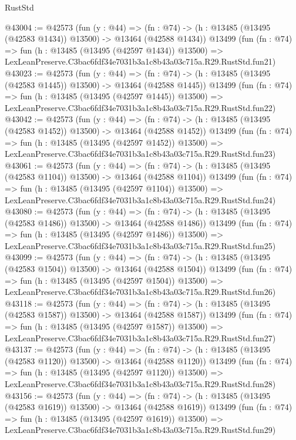 \begin{lexlean}{RustStd}
\begin{coremodule}
@43004 := @42573
    (fun (y : @44) =>
    (fn : @74) -> (h : @13485 (@13495 (@42583 @1434)) @13500) -> @13464 (@42588 @1434))
    @13499
    (fun (fn : @74) =>
    fun (h : @13485 (@13495 (@42597 @1434)) @13500) =>
    LexLeanPreserve.C3bac6fdf34e7031b3a1c8b43a03c715a.R29.RustStd.fun21)
@43023 := @42573
    (fun (y : @44) =>
    (fn : @74) -> (h : @13485 (@13495 (@42583 @1445)) @13500) -> @13464 (@42588 @1445))
    @13499
    (fun (fn : @74) =>
    fun (h : @13485 (@13495 (@42597 @1445)) @13500) =>
    LexLeanPreserve.C3bac6fdf34e7031b3a1c8b43a03c715a.R29.RustStd.fun22)
@43042 := @42573
    (fun (y : @44) =>
    (fn : @74) -> (h : @13485 (@13495 (@42583 @1452)) @13500) -> @13464 (@42588 @1452))
    @13499
    (fun (fn : @74) =>
    fun (h : @13485 (@13495 (@42597 @1452)) @13500) =>
    LexLeanPreserve.C3bac6fdf34e7031b3a1c8b43a03c715a.R29.RustStd.fun23)
@43061 := @42573
    (fun (y : @44) =>
    (fn : @74) -> (h : @13485 (@13495 (@42583 @1104)) @13500) -> @13464 (@42588 @1104))
    @13499
    (fun (fn : @74) =>
    fun (h : @13485 (@13495 (@42597 @1104)) @13500) =>
    LexLeanPreserve.C3bac6fdf34e7031b3a1c8b43a03c715a.R29.RustStd.fun24)
@43080 := @42573
    (fun (y : @44) =>
    (fn : @74) -> (h : @13485 (@13495 (@42583 @1486)) @13500) -> @13464 (@42588 @1486))
    @13499
    (fun (fn : @74) =>
    fun (h : @13485 (@13495 (@42597 @1486)) @13500) =>
    LexLeanPreserve.C3bac6fdf34e7031b3a1c8b43a03c715a.R29.RustStd.fun25)
@43099 := @42573
    (fun (y : @44) =>
    (fn : @74) -> (h : @13485 (@13495 (@42583 @1504)) @13500) -> @13464 (@42588 @1504))
    @13499
    (fun (fn : @74) =>
    fun (h : @13485 (@13495 (@42597 @1504)) @13500) =>
    LexLeanPreserve.C3bac6fdf34e7031b3a1c8b43a03c715a.R29.RustStd.fun26)
@43118 := @42573
    (fun (y : @44) =>
    (fn : @74) -> (h : @13485 (@13495 (@42583 @1587)) @13500) -> @13464 (@42588 @1587))
    @13499
    (fun (fn : @74) =>
    fun (h : @13485 (@13495 (@42597 @1587)) @13500) =>
    LexLeanPreserve.C3bac6fdf34e7031b3a1c8b43a03c715a.R29.RustStd.fun27)
@43137 := @42573
    (fun (y : @44) =>
    (fn : @74) -> (h : @13485 (@13495 (@42583 @1120)) @13500) -> @13464 (@42588 @1120))
    @13499
    (fun (fn : @74) =>
    fun (h : @13485 (@13495 (@42597 @1120)) @13500) =>
    LexLeanPreserve.C3bac6fdf34e7031b3a1c8b43a03c715a.R29.RustStd.fun28)
@43156 := @42573
    (fun (y : @44) =>
    (fn : @74) -> (h : @13485 (@13495 (@42583 @1619)) @13500) -> @13464 (@42588 @1619))
    @13499
    (fun (fn : @74) =>
    fun (h : @13485 (@13495 (@42597 @1619)) @13500) =>
    LexLeanPreserve.C3bac6fdf34e7031b3a1c8b43a03c715a.R29.RustStd.fun29)

\end{coremodule}
\end{lexlean}
